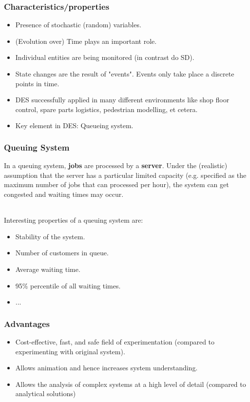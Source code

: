 \subsubsection{Characteristics/properties}

\begin{itemize}
	\tightlist
	\item Presence of stochastic (random) variables.
	\item (Evolution over) Time plays an important role.
	\item Individual entities are being monitored (in contrast do SD).
	\item State changes are the result of "events". Events only take place a
	discrete points in time.
	\item DES successfully applied in many different environments like shop
	floor control, spare parts logistics, pedestrian modelling, et cetera.
	\item Key element in DES: Queueing system.
\end{itemize}


\subsubsection{Queuing System}

In a queuing system, \textbf{jobs} are processed by a \textbf{server}.
Under the (realistic) assumption that the server has a particular
limited capacity (e.g. specified as the maximum number of jobs that can
processed per hour), the system can get congested and waiting times may
occur.

\mbox{}\\
Interesting properties of a queuing system are:
\begin{itemize}
	\tightlist
	\item Stability of the system.
	\item Number of customers in queue.
	\item Average waiting time.
	\item 95\% percentile of all waiting times.
	\item ...
\end{itemize}

\subsubsection{Advantages}

\begin{itemize}
	\tightlist
	\item Cost-effective, fast, and safe field of experimentation (compared to
	experimenting with original system).
	\item Allows animation and hence increases system understanding.
	\item Allows the analysis of complex systems at a high level of detail
	(compared to analytical solutions)
\end{itemize}


